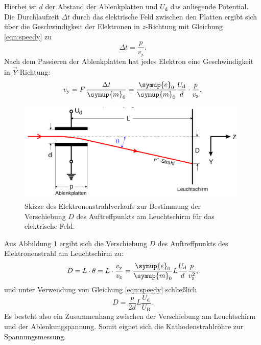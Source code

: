 Hierbei ist $d$ der Abstand der Ablenkplatten und $U_\mathrm{d}$ das anliegende Potential.\\
Die Durchlaufzeit $\Delta t$ durch das elektrische Feld zwischen den Platten ergibt sich über die Geschwindigkeit der Elektronen in $z$-Richtung mit Gleichung \eqref{eqn:speedy} zu
\begin{equation}
  \Delta t=\frac{p}{v_\mathrm{z}} \text{.}
\end{equation}
Nach dem Passieren der Ablenkplatten hat jedes Elektron eine Geschwindigkeit in $\vec{Y}$-Richtung:
\begin{equation}
  v_\mathrm{y}=F \, \frac{\Delta t}{\symup{m}_0}=\frac{\symup{e}_0}{\symup{m}_0}\frac{U_\mathrm{d}}{d}\cdot\frac{p}{v_\mathrm{z}} \text{.}
\end{equation}
\begin{figure}
  \centering
  \includegraphics[width=0.98\textwidth]{Messdaten/ablenkung.png}
  \caption{Skizze des Elektronenstrahlverlaufs zur Bestimmung der Verschiebung $D$ des Auftreffpunkts am Leuchtschirm für das elektrische Feld.}
  \label{fig:ablenkii}
\end{figure}
Aus Abbildung \ref{fig:ablenkii} ergibt sich die Verschiebung $D$ des Auftreffpunkts des Elektronenstrahl am Leuchtschirm zu:
\begin{equation}
    D=L \cdot \theta=L \cdot \frac{v_\mathrm{y}}{v_\mathrm{z}}=\frac{\symup{e}_0}{\symup{m}_0}L\frac{U_\mathrm{d}}{d}\frac{p}{v_\mathrm{z}^2} \text{,}
\end{equation}
und unter Verwendung von Gleichung \eqref{eqn:speedy} schließlich
\begin{equation}
  \label{eqn:K}
  D=\frac{p}{2d}L\frac{U_\mathrm{d}}{U_\mathrm{B}} \text{.}
\end{equation}
Es besteht also ein Zusammenhang zwischen der Verschiebung am Leuchtschirm und der Ablenkungspannung. Somit eignet sich die Kathodenstrahlröhre zur Spannungsmessung.
